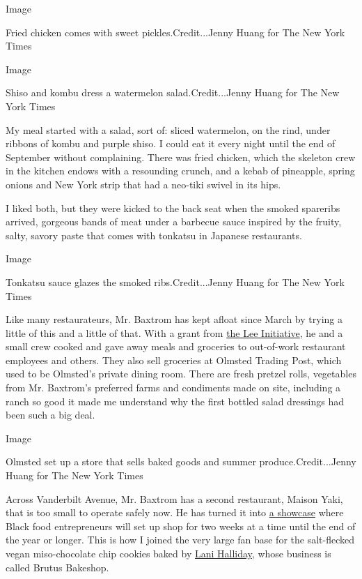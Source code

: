 Image

Fried chicken comes with sweet pickles.Credit...Jenny Huang for The New
York Times

Image

Shiso and kombu dress a watermelon salad.Credit...Jenny Huang for The
New York Times

My meal started with a salad, sort of: sliced watermelon, on the rind,
under ribbons of kombu and purple shiso. I could eat it every night
until the end of September without complaining. There was fried chicken,
which the skeleton crew in the kitchen endows with a resounding crunch,
and a kebab of pineapple, spring onions and New York strip that had a
neo-tiki swivel in its hips.

I liked both, but they were kicked to the back seat when the smoked
spareribs arrived, gorgeous bands of meat under a barbecue sauce
inspired by the fruity, salty, savory paste that comes with tonkatsu in
Japanese restaurants.

Image

Tonkatsu sauce glazes the smoked ribs.Credit...Jenny Huang for The New
York Times

Like many restaurateurs, Mr. Baxtrom has kept afloat since March by
trying a little of this and a little of that. With a grant from
\href{https://leeinitiative.org/}{the Lee Initiative}, he and a small
crew cooked and gave away meals and groceries to out-of-work restaurant
employees and others. They also sell groceries at Olmsted Trading Post,
which used to be Olmsted's private dining room. There are fresh pretzel
rolls, vegetables from Mr. Baxtrom's preferred farms and condiments made
on site, including a ranch so good it made me understand why the first
bottled salad dressings had been such a big deal.

Image

Olmsted set up a store that sells baked goods and summer
produce.Credit...Jenny Huang for The New York Times

Across Vanderbilt Avenue, Mr. Baxtrom has a second restaurant, Maison
Yaki, that is too small to operate safely now. He has turned it into
\href{https://resy.com/cities/ny/maison-yaki?date=2020-07-21\&seats=2}{a
showcase} where Black food entrepreneurs will set up shop for two weeks
at a time until the end of the year or longer. This is how I joined the
very large fan base for the salt-flecked vegan miso-chocolate chip
cookies baked by \href{https://www.lanihalliday.com/}{Lani Halliday},
whose business is called Brutus Bakeshop.

